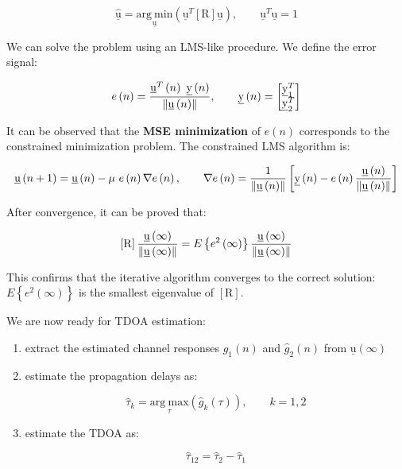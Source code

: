 \[
\underline{\hat{\mathrm{u}}} = \underset{\underline{\mathrm{u}}}{\mathrm{arg \ min}} \left( \underline{\mathrm{u}}^{T}  \left[\mathrm{R}\right] \underline{\mathrm{u}}\right),
\qquad
\underline{\mathrm{u}}^{T} \underline{\mathrm{u}} = 1
\]

We can solve the problem using an LMS-like procedure.
We define the error signal:

\[
e\left( n \right) = \frac{\underline{\mathrm{u}}^{T}\left( n \right) \  \underline{\mathrm{y}}\left( n \right)}{\norm{\underline{\mathrm{u}} \left( n \right)}},
\qquad
\underline{\mathrm{y}}\left( n \right) = 
\begin{bmatrix}
\underline{\mathrm{y}}_{1}^{T} \\
\underline{\mathrm{y}}_{2}^{T}
\end{bmatrix}
\]

It can be observed that the \textbf{MSE minimization} of $e\left( n \right)$ corresponds to the constrained minimization problem.
The constrained LMS algorithm is:

\[
\underline{\mathrm{u}}\left( n + 1 \right) = \underline{\mathrm{u}}\left( n \right) - \mu \ e\left( n \right) \nabla e\left( n \right),
\qquad
\nabla e\left( n \right) = \frac{1}{\norm{\underline{\mathrm{u}} \left( n \right)}}
\left[ 
\underline{\mathrm{y}}\left( n \right) - e\left( n \right) \frac{\underline{\mathrm{u}}\left( n \right)}{\norm{\underline{\mathrm{u}} \left( n \right)}}
\right]
\]

After convergence, it can be proved that:

\[
\left[ \mathrm{R} \right] \frac{\underline{\mathrm{u}}\left( \infty \right)}{\norm{\underline{\mathrm{u}}\left( \infty \right)}} =
E \left\{ e^{2}\left( \infty \right) \right\} \frac{\underline{\mathrm{u}}\left( \infty \right)}{\norm{\underline{\mathrm{u}}\left( \infty \right)}}
\]

This confirms that the iterative algorithm converges to the correct solution:
$E \left\{ e^{2}\left( \infty \right) \right\} $ is the smallest eigenvalue of $\left[ \mathrm{R} \right]$.

We are now ready for TDOA estimation:

\begin{enumerate}
    \item extract the estimated channel responses $\hat{g}_{1}(n)$ and $\hat{g}_{2}(n)$ from $\underline{\mathrm{u}}\left( \infty \right)$

    \item estimate the propagation delays as:

    \[
    \hat{\tau}_{k} = \underset{\tau}{\mathrm{arg \ max}} \left( \hat{g}_{k}\left( \tau \right) \right),
    \qquad
    k = 1, 2
    \]

    \item estimate the TDOA as:

    \[
    \hat{\tau}_{12} = \hat{\tau}_{2} - \hat{\tau}_{1}
    \]
\end{enumerate}

\clearpage
